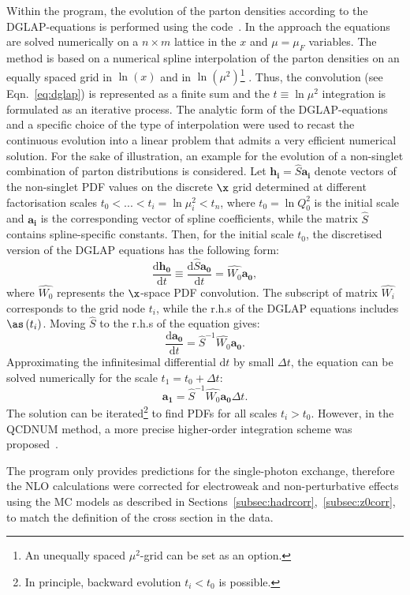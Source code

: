 Within the \herafitter program, the evolution of the parton densities according to the DGLAP-equations is performed using the \qcdnum code~\cite{Botje:2010ay}. In the \qcdnum approach the equations are solved numerically on a $n\times m$ lattice in the $x$ and $\mu=\mu_F$ variables. The method is based on a numerical spline interpolation of the parton densities on an equally spaced grid in $\ln\left(x\right)$ and in $\ln\left(\mu^2\right)$\footnote{An unequally spaced $\mu^2$-grid can be set as an option.} . Thus, the convolution (see Eqn.~\eqref{eq:dglap}) is represented as a finite sum and the $t \equiv \ln{\mu^2}$ integration is formulated as an iterative process.
The analytic form of the DGLAP-equations and a specific choice of the type of interpolation were used to recast the continuous evolution into a linear problem that admits a very efficient numerical solution. For the sake of illustration, an example for the evolution of a non-singlet combination of parton distributions is considered. Let $\mathbf{h_i}=\hat{S}\mathbf{a_i}$ denote vectors of the non-singlet PDF values on the discrete $\x$ grid determined at different factorisation scales $t_0 < ... < t_i=\ln{\mu^2_i} < t_n$, where $t_0=\ln{Q^2_0}$ is the initial scale and $\mathbf{a_i}$ is the corresponding vector of spline coefficients, while the matrix $\hat{S}$ contains spline-specific constants. Then, for the initial scale $t_0$, the discretised version of the DGLAP equations has the following form:
\begin{equation}
 \frac{\mathrm{d}\mathbf{h_0}}{\mathrm{d}t} \equiv \frac{\mathrm{d}\hat{S}\mathbf{a_0}}{\mathrm{d}t} = \hat{W_0}\mathbf{a_0},
\end{equation}
where $\hat{W_0}$ represents the $\x$-space PDF convolution. The subscript of matrix $\hat{W_i}$ corresponds to the grid node $t_i$, while the r.h.s of the DGLAP equations includes $\as\left(t_i\right)$. Moving $\hat{S}$ to the r.h.s of the equation gives:
\begin{equation}
 \frac{\mathrm{d}\mathbf{a_0}}{\mathrm{d}t} = \hat{S}^{-1}\hat{W_0}\mathbf{a_0}.
\end{equation}
Approximating the infinitesimal differential $\mathrm{d}t$ by small $\Delta t$, the equation can be solved numerically for the scale $t_1=t_0+\Delta t$:
\begin{equation}
 \mathbf{a_1} = \hat{S}^{-1}\hat{W_0}\mathbf{a_0}\Delta t.
\end{equation}
The solution can be iterated\footnote{In principle, backward evolution $t_i<t_0$ is possible.} to find PDFs for all scales $t_i>t_0$. However, in the QCDNUM method, a more precise higher-order integration scheme was proposed~\cite{Botje:2010ay}.

The \nlojet program only provides predictions for the single-photon exchange, therefore the NLO calculations were corrected for electroweak and non-perturbative effects using the MC models as described in Sections~\ref{subsec:hadrcorr},~\ref{subsec:z0corr}, to match the definition of the cross section in the data.
